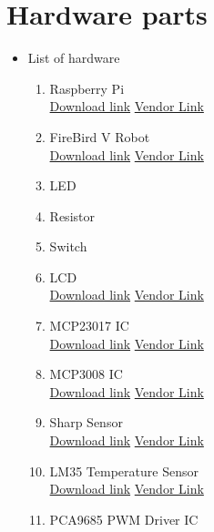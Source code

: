 \documentclass[a4paper,12pt,oneside]{book}
\begin{document}
\section{Hardware parts}
\begin{itemize}
  \item List of hardware 
  \begin{enumerate}
      \item Raspberry Pi \\
      \href{https://cdn-shop.adafruit.com/pdfs/raspberrypi2modelb.pdf} {Download link}
      \href{http://www.amazon.in/Raspberry-Pi-Model-1GB-Complete/dp/B00T2U7R7I} {Vendor Link}
      \item FireBird V Robot \\
      \href{http://www.atmel.com/Images/Atmel-2549-8-bit-AVR-Microcontroller-ATmega640-1280-1281-2560-2561_datasheet.pdf} {Download link}
      \href{http://www.nex-robotics.com/products/fire-bird-v-robots/fire-bird-v-atmega2560-robotic-research-platform.html} {Vendor Link}
      \item LED
      \item Resistor
      \item Switch
      \item LCD   \\
      \href{http://www.agspecinfo.com/pdfs/J/JHD162A.PDF} {Download link}
      \href{http://www.amazon.in/JCE-16x2-LCD-Display/dp/B00OVY28M4} {Vendor Link}
      \item MCP23017 IC     \\
      \href{https://cdn-shop.adafruit.com/datasheets/mcp23017.pdf} {Download link}
      \href{http://www.smddevices.com/} {Vendor Link}
      \item MCP3008 IC       \\
      \href{https://cdn-shop.adafruit.com/datasheets/MCP3008.pdf} {Download link}
      \href{http://www.dnatechindia.com/MCP3008-10-Bit-ADC.html} {Vendor Link}
      \item Sharp Sensor      \\
      \href{http://www.sharpsma.com/webfm_send/1208} {Download link}
      \href{http: //www.ebay.in/itm/262401450416?aff_source=Sok-Goog} {Vendor Link}
      \item LM35 Temperature Sensor    \\
      \href{http://www.ti.com/lit/ds/symlink/lm35.pdf} {Download link}
      \href{http://www.amazon.in/Robo-India-Temperature-Sensor-LM35/dp/B00WO5AFPE} {Vendor Link}
      \item PCA9685 PWM Driver IC  \\

\end{enumerate}
\end{itemize}
\end{document}
